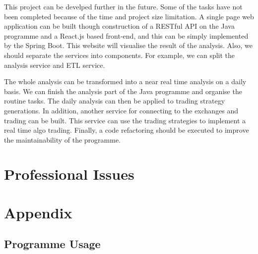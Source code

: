 \documentclass[11pt]{article} %
\theoremstyle{plain}
\theoremstyle{definition}
\begin{document}
This project can be develped further in the future. Some of the tasks have not been completed because of the time and project size limitation. A single page web application can be built though construction of a RESTful API on the Java programme and a React.js based front-end, and this can be simply implemented by the Spring Boot. This website will visualise the result of the analysis. Also, we should separate the services into components. For example, we can split the analysis service and ETL service.

The whole analysis can be transformed into a near real time analysis on a daily basis. We can finish the analysis part of the Java programme and organise the routine tasks. The daily analysis can then be applied to trading strategy generations. In addition, another service for connecting to the exchanges and trading can be built. This service can use the trading strategies to implement a real time algo trading. Finally, a code refactoring should be executed to improve the maintainability of the programme.

\section{Professional Issues}



\section{Appendix}
\subsection{Programme Usage}



\end{document}
